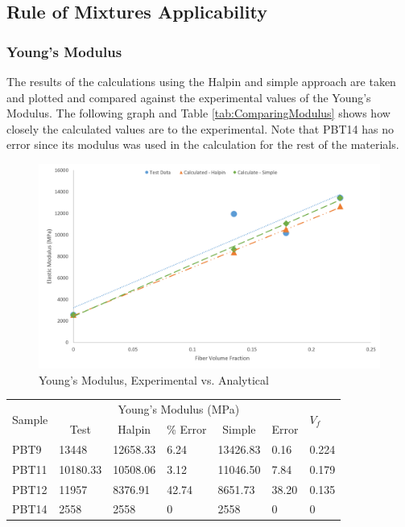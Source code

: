 \documentclass[11pt]{article}
\begin{document}
\subsection{Rule of Mixtures Applicability}

\subsubsection{Young's Modulus}

The results of the calculations using the Halpin and simple approach are taken and plotted and compared against the experimental values of the Young's Modulus. The following graph and Table \ref{tab:ComparingModulus} shows how closely the calculated values are to the experimental. Note that PBT14 has no error since its modulus was used in the calculation for the rest of the materials.

\begin{figure}[H]
\centering
\includegraphics[width=.95\linewidth]{figures/modulus_test_vs_calc.png}
\caption{Young's Modulus, Experimental vs. Analytical}
\label{ModulusCompare}
\end{figure}

\newpage
\begin{center}
 \label{tab:ComparingModulus}
\begin{tabular}{p{1.25cm} || p{1.5cm} | p{1.5cm} | p{1.5cm} | p{1.5cm} | p{1.5cm} | p{1.5cm}}
\hline
 \multirow{2}{*}{Sample} & \multicolumn{5}{c|}{Young's Modulus (MPa)} & \multirow{2}{*}{\(V_f\)} \\
   &  \multicolumn{1}{c}{Test} & \multicolumn{1}{c}{Halpin} & \multicolumn{1}{c}{\% Error} & \multicolumn{1}{c}{Simple} & \multicolumn{1}{c|}{ Error} \\
\hline
PBT9 & 13448 & 12658.33 & 6.24 & 13426.83 & 0.16 & 0.224\\
PBT11 & 10180.33 & 10508.06 & 3.12 & 11046.50 & 7.84 &  0.179\\
PBT12 & 11957 & 8376.91 & 42.74 & 8651.73 & 38.20 & 0.135 \\
PBT14 & 2558 & 2558 & 0 & 2558 & 0 & 0\\
\hline
\end{tabular}
\end{center}
\singlespacing
\end{document}
